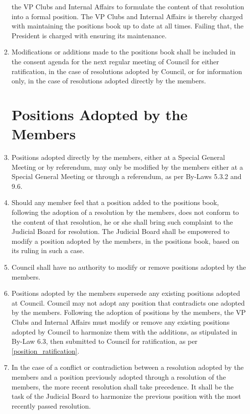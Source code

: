 \documentclass[oneside]{book}
\begin{document}
\begin{enumerate}
the VP Clubs and Internal Affairs to formulate the content of that resolution into a formal position. 
The VP Clubs and Internal Affairs is thereby charged with maintaining the
positions book up to date at all times. Failing that, the President is charged with ensuring its maintenance.
\item\label{position_ratification} Modifications or additions made to the positions book shall be included in the consent agenda 
for the next regular meeting of Council for either ratification, in the case of resolutions adopted 
by Council, or for information only, in the case of resolutions adopted directly by the members.

\chapter{\label{POSITIONS_ADOPTED_BY_MEMBERS}Positions Adopted by the Members}

\item Positions adopted directly by the members, either at a Special General Meeting 
or by referendum, may only be modified by the members either at a Special General Meeting 
or through a referendum, as per By-Laws 5.3.2 and 9.6.
\item Should any member feel that a position added to the positions book, following the 
adoption of a resolution by the members, does not conform to the content of that resolution, 
he or she shall bring such complaint to the Judicial Board for resolution. The Judicial 
Board shall be empowered to modify a position adopted by the members, in the positions book, 
based on its ruling in such a case.
\item Council shall have no authority to modify or remove positions adopted by the members.
\item Positions adopted by the members supersede any existing positions adopted at Council. 
Council may not adopt any position that contradicts one adopted by the members. Following 
the adoption of positions by the members, the VP Clubs and Internal Affairs must modify or 
remove any existing positions adopted by Council to harmonize them with the additions, as 
stipulated in By-Law 6.3, then submitted to Council for ratification, as per \ref{position_ratification}.
\item In the case of a conflict or contradiction between a resolution adopted by the members 
and a position previously adopted through a resolution of the members, the more recent 
resolution shall take precedence. It shall be the task of the Judicial Board to harmonize 
the previous position with the most recently passed resolution.


\end{enumerate}
\end{document}
